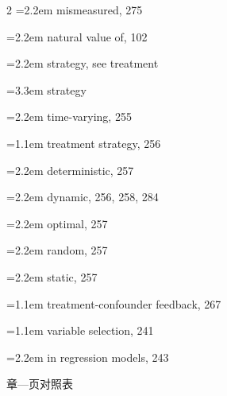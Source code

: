 \begin{multicols}{2}
\hspace*{1.1em}\hangindent=2.2em mismeasured, 275\par
\hspace*{1.1em}\hangindent=2.2em natural value of, 102\par
\hspace*{1.1em}\hangindent=2.2em strategy, see treatment\par
\hspace*{2.2em}\hangindent=3.3em strategy\par
\hspace*{1.1em}\hangindent=2.2em time-varying, 255\par
\hangindent=1.1em treatment strategy, 256\par
\hspace*{1.1em}\hangindent=2.2em deterministic, 257\par
\hspace*{1.1em}\hangindent=2.2em dynamic, 256, 258, 284\par
\hspace*{1.1em}\hangindent=2.2em optimal, 257\par
\hspace*{1.1em}\hangindent=2.2em random, 257\par
\hspace*{1.1em}\hangindent=2.2em static, 257\par
\hangindent=1.1em treatment-confounder feedback, 267\par
\hangindent=1.1em variable selection, 241\par
\hspace*{1.1em}\hangindent=2.2em in regression models, 243\par
\end{multicols}
\endgroup
\clearpage
\thispagestyle{plain}
\begin{center}\heiti\small 章—页对照表\end{center}
